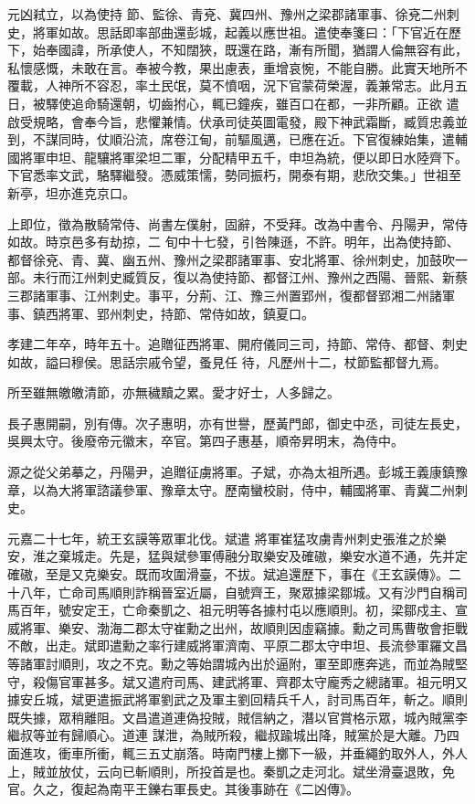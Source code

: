 \begin{pinyinscope}
 元凶弒立，以為使持
 節、監徐、青兗、冀四州、豫州之梁郡諸軍事、徐兗二州刺史，將軍如故。思話即率部曲還彭城，起義以應世祖。遣使奉箋曰：「下官近在歷下，始奉國諱，所承使人，不知闊狹，既還在路，漸有所聞，猶謂人倫無容有此，私懷感慨，未敢在言。奉被今教，果出慮表，重增哀惋，不能自勝。此實天地所不覆載，人神所不容忍，率土民氓，莫不憤咽，況下官蒙荷榮渥，義兼常志。此月五日，被驛使追命騎還朝，切齒拊心，輒已鐘疾，雖百口在都，一非所顧。正欲
 遣啟受規略，會奉今旨，悲懼兼情。伏承司徒英圖電發，殿下神武霜斷，臧質忠義並到，不謀同時，仗順沿流，席卷江甸，前驅風邁，已應在近。下官復練始集，遣輔國將軍申坦、龍驤將軍梁坦二軍，分配精甲五千，申坦為統，便以即日水陸齊下。下官悉率文武，駱驛繼發。憑威策懦，勢同振朽，開泰有期，悲欣交集。」世祖至新亭，坦亦進克京口。



 上即位，徵為散騎常侍、尚書左僕射，固辭，不受拜。改為中書令、丹陽尹，常侍如故。時京邑多有劫掠，二
 旬中十七發，引咎陳遜，不許。明年，出為使持節、都督徐兗、青、冀、幽五州、豫州之梁郡諸軍事、安北將軍、徐州刺史，加鼓吹一部。未行而江州刺史臧質反，復以為使持節、都督江州、豫州之西陽、晉熙、新蔡三郡諸軍事、江州刺史。事平，分荊、江、豫三州置郢州，復都督郢湘二州諸軍事、鎮西將軍、郢州刺史，持節、常侍如故，鎮夏口。



 孝建二年卒，時年五十。追贈征西將軍、開府儀同三司，持節、常侍、都督、刺史如故，謚曰穆侯。思話宗戚令望，蚤見任
 待，凡歷州十二，杖節監都督九焉。



 所至雖無皦皦清節，亦無穢黷之累。愛才好士，人多歸之。



 長子惠開嗣，別有傳。次子惠明，亦有世譽，歷黃門郎，御史中丞，司徒左長史，吳興太守。後廢帝元徽末，卒官。第四子惠基，順帝昇明末，為侍中。



 源之從父弟摹之，丹陽尹，追贈征虜將軍。子斌，亦為太祖所遇。彭城王義康鎮豫章，以為大將軍諮議參軍、豫章太守。歷南蠻校尉，侍中，輔國將軍、青冀二州刺史。



 元嘉二十七年，統王玄謨等眾軍北伐。斌遣
 將軍崔猛攻虜青州刺史張淮之於樂安，淮之棄城走。先是，猛與斌參軍傅融分取樂安及確磝，樂安水道不通，先并定確磝，至是又克樂安。既而攻圍滑臺，不拔。斌追還歷下，事在《王玄謨傳》。二十八年，亡命司馬順則詐稱晉室近屬，自號齊王，聚眾據梁鄒城。又有沙門自稱司馬百年，號安定王，亡命秦凱之、祖元明等各據村屯以應順則。初，梁鄒戍主、宣威將軍、樂安、渤海二郡太守崔勳之出州，故順則因虛竊據。勳之司馬曹敬會拒戰
 不敵，出走。斌即遣勳之率行建威將軍濟南、平原二郡太守申坦、長流參軍羅文昌等諸軍討順則，攻之不克。勳之等始謂城內出於逼附，軍至即應奔逃，而並為賊堅守，殺傷官軍甚多。斌又遣府司馬、建武將軍、齊郡太守龐秀之總諸軍。祖元明又據安丘城，斌更遣振武將軍劉武之及軍主劉回精兵千人，討司馬百年，斬之。順則既失據，眾稍離阻。文昌遣道連偽投賊，賊信納之，潛以官賞格示眾，城內賊黨李繼叔等並有歸順心。道連
 謀泄，為賊所殺，繼叔踰城出降，賊黨於是大離。乃四面進攻，衝車所衝，輒三五丈崩落。時南門樓上擲下一級，并垂繩釣取外人，外人上，賊並放仗，云向已斬順則，所投首是也。秦凱之走河北。斌坐滑臺退敗，免官。久之，復起為南平王鑠右軍長史。其後事跡在《二凶傳》。




\end{pinyinscope}
